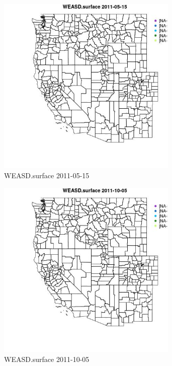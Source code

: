\begin{figure} 
\centering  
\includegraphics[width=0.77\textwidth]{Code_Outputs/ML_input_report_ML_input_PM25_Step5_part_d_de_duplicated_aves_ML_input_MapObsWEASDsurface2011-05-15.jpg} 
\caption{\label{fig:ML_input_report_ML_input_PM25_Step5_part_d_de_duplicated_aves_ML_inputMapObsWEASDsurface2011-05-15}WEASD.surface 2011-05-15} 
\end{figure} 
 

\begin{figure} 
\centering  
\includegraphics[width=0.77\textwidth]{Code_Outputs/ML_input_report_ML_input_PM25_Step5_part_d_de_duplicated_aves_ML_input_MapObsWEASDsurface2011-10-05.jpg} 
\caption{\label{fig:ML_input_report_ML_input_PM25_Step5_part_d_de_duplicated_aves_ML_inputMapObsWEASDsurface2011-10-05}WEASD.surface 2011-10-05} 
\end{figure} 
 

